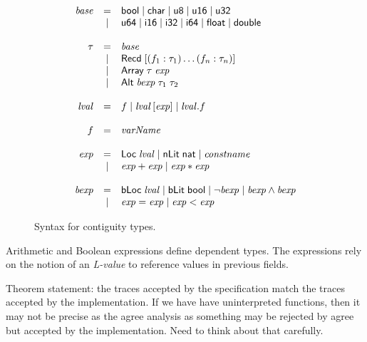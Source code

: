 \begin{figure}
\[
\begin{array}{rcl}
 \mathit{base} & = & \mathsf{bool} \mid \mathsf{char} \mid \mathsf{u8} \mid \mathsf{u16} \mid \mathsf{u32} \\
               & \mid & \mathsf{u64}  \mid \mathsf{i16} \mid \mathsf{i32} \mid \mathsf{i64} \mid \mathsf{float} \mid \mathsf{double} \\ \\

 \tau & = & \mathit{base} \\
      & \mid & \mathsf{Recd}\; [ (f_1 : \tau_1) \ldots (f_n : \tau_n) ] \\
      & \mid & \mathsf{Array}\; \tau \; \mathit{exp} \\
      & \mid & \mathsf{Alt}\; \mathit{bexp}\; \tau_1 \; \tau_2 \\ \\

\mathit{lval} & = & f \mid
                    \mathit{lval} \, [ \mathit{exp} ] \mid
                    \mathit{lval} . f \\ \\
f            & = & \mathit{varName} \\ \\
\mathit{exp} & = & \mathsf{Loc}\; \mathit{lval}
              \mid \mathsf{nLit}\; \mathsf{nat}
              \mid \mathit{constname} \\
             & \mid & \mathit{exp} + \mathit{exp}
                   \mid \mathit{exp} * \mathit{exp} \\ \\

\mathit{bexp} & = & \mathsf{bLoc}\; \mathit{lval}
              \mid  \mathsf{bLit}\; \mathsf{bool}
              \mid  \neg \mathit{bexp}
              \mid  \mathit{bexp} \land \mathit{bexp} \\
              & \mid & \mathit{exp} = \mathit{exp} 
              \mid  \mathit{exp} < \mathit{exp}
\end{array}
\]
\caption{Syntax for contiguity types.}
\label{contig-types}
\end{figure}

Arithmetic and Boolean expressions define dependent types. The expressions rely on the notion of an \emph{L-value} to reference values in previous fields.

Theorem statement: the traces accepted by the specification match the traces accepted by the implementation. If we have have uninterpreted functions, then it may not be precise as the agree analysis as something may be rejected by agree but accepted by the implementation. Need to think about that carefully.

